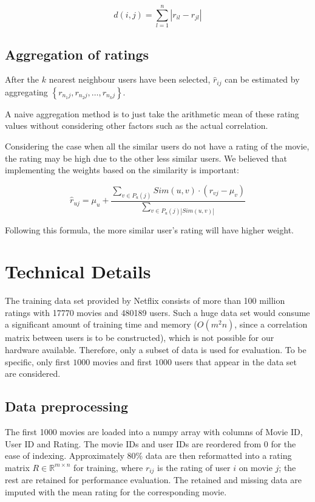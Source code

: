 \documentclass[final]{cvpr}
\newcommand{\Set}[1]{\left\{ #1 \right\}}
\begin{document}
$$ d(i, j) = \sum_{l=1}^n \left| r_{il} - r_{jl} \right| $$

\subsection{Aggregation of ratings}
After the $k$ nearest neighbour users have been selected,
$\hat r_{ij}$ can be estimated by aggregating $\Set{ r_{n_1j}, r_{n_2j}, \ldots, r_{n_kj} }$.

A naive aggregation method is to just take the arithmetic mean of these rating values
without considering other factors such as the actual correlation.

Considering the case when all the similar users do not have a rating of the movie, the rating may be high due to the other less similar users. We believed that implementing the weights based on the similarity is important:

$$ \hat r_{uj} = \mu_u + \frac{\sum_{v \in P_u(j)}  Sim(u,v)\cdot(r_{vj}-\mu_v)}{\sum_{v \in P_u(j) |Sim(u,v)|}}  $$

Following this formula, the more similar user's rating will have higher weight.

\section{Technical Details}
The training data set provided by Netflix consists of more than 100 million ratings with 17770 movies and 480189 users.
Such a huge data set would consume a significant amount of training time and memory
($O(m^2 n)$, since a correlation matrix between users is to be constructed),
which is not possible for our hardware available.
Therefore, only a subset of data is used for evaluation.
To be specific, only first $1000$ movies and first $1000$ users that appear in the data set are considered.

\subsection{Data preprocessing}
The first 1000 movies are loaded into a numpy array with columns of Movie ID, User ID and Rating.
The movie IDs and user IDs are reordered from 0 for the ease of indexing.
Approximately $80\%$ data are then reformatted into a rating matrix $R \in \mathbb R^{m \times n}$ for training,
where $r_{ij}$ is the rating of user $i$ on movie $j$;
the rest are retained for performance evaluation.
The retained and missing data are imputed with the mean rating for the corresponding movie.
\end{document}
